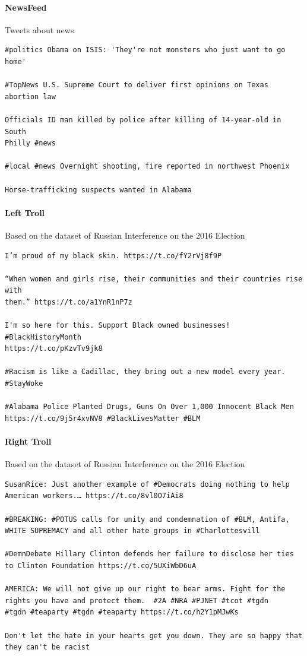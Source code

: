 \documentclass[12pt, letterpaper]{article}
\begin{document}
\paragraph*{NewsFeed}Tweets about news

{
\color{gray}
\begin{verbatim}
#politics Obama on ISIS: 'They're not monsters who just want to go home'

#TopNews U.S. Supreme Court to deliver first opinions on Texas abortion law

Officials ID man killed by police after killing of 14-year-old in South 
Philly #news

#local #news Overnight shooting, fire reported in northwest Phoenix

Horse-trafficking suspects wanted in Alabama
\end{verbatim}
}

\paragraph*{Left Troll}Based on the dataset of Russian Interference on the 2016 Election
{
\color{gray}
\begin{verbatim}
I’m proud of my black skin. https://t.co/fY2rVj8f9P

“When women and girls rise, their communities and their countries rise with
them.” https://t.co/a1YnR1nP7z

I'm so here for this. Support Black owned businesses! #BlackHistoryMonth 
https://t.co/pKzvTv9jk8

#Racism is like a Cadillac, they bring out a new model every year. 
#StayWoke

#Alabama Police Planted Drugs, Guns On Over 1,000 Innocent Black Men 
https://t.co/9j5r4xvNV8 #BlackLivesMatter #BLM
\end{verbatim}
}

\paragraph*{Right Troll}Based on the dataset of Russian Interference on the 2016 Election
{
\color{gray}
\begin{verbatim}
SusanRice: Just another example of #Democrats doing nothing to help 
American workers.… https://t.co/8vl0O7iAi8

#BREAKING: #POTUS calls for unity and condemnation of #BLM, Antifa, 
WHITE SUPREMACY and all other hate groups in #Charlottesvill

#DemnDebate Hillary Clinton defends her failure to disclose her ties 
to Clinton Foundation https://t.co/5UXiWbD6uA

AMERICA: We will not give up our right to bear arms. Fight for the 
rights you have and protect them.  #2A #NRA #PJNET #tcot #tgdn 
#tgdn #teaparty #tgdn #teaparty https://t.co/h2Y1pMJwKs

Don't let the hate in your hearts get you down. They are so happy that 
they can't be racist
\end{verbatim}
}
\end{document}
